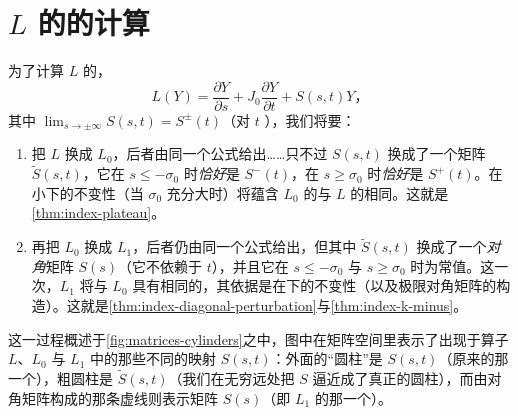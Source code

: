 
\section{\texorpdfstring{$L$}{L} 的\trIndex{}的计算}
\label{sec:index-computation}

为了计算 $L$ 的\trIndex，
\[
L(Y)=\frac{\partial Y}{\partial s}+J_0\frac{\partial Y}{\partial t}+S(s,t)Y\text{，}
\]
其中 $\lim_{s\to\pm\infty}S(s,t)=S^{\pm}(t)$（对 $t$ \trUniform），我们将要：
\begin{enumerate}[label=(\arabic*)]
\item 把 $L$ 换成 $L_0$，后者由同一个公式给出……只不过 $S(s,t)$ 换成了一个矩阵 $\widetilde{S}(s,t)$，它在 $s\le-\sigma_0$ 时\emph{恰好}是 $S^{-}(t)$，在 $s\ge\sigma_0$ 时\emph{恰好}是 $S^{+}(t)$。\trIndex{}在小\trPerturbation{}下的不变性（当 $\sigma_0$ 充分大时）将蕴含 $L_0$ 的\trIndex{}与 $L$ 的相同。这就是\cref{thm:index-plateau}。
\item 再把 $L_0$ 换成 $L_1$，后者仍由同一个公式给出，但其中 $\widetilde{S}(s,t)$ 换成了一个\emph{对角}矩阵 $S(s)$（它不依赖于 $t$），并且它在 $s\le-\sigma_0$ 与 $s\ge\sigma_0$ 时为常值。这一次，$L_1$ 将与 $L_0$ 具有相同的\trIndex，其依据是\trIndex{}在\trHomotopy{}下的不变性（以及极限对角矩阵的构造）。这就是\cref{thm:index-diagonal-perturbation}与\cref{thm:index-k-minus}。
\end{enumerate}

这一过程概述于\cref{fig:matrices-cylinders}之中，图中在矩阵空间里表示了出现于算子 $L$、$L_0$ 与 $L_1$ 中的那些不同的映射 $S(s,t)$：外面的“圆柱”是 $S(s,t)$（原来的那一个），粗圆柱是 $\widetilde{S}(s,t)$（我们在无穷远处把 $S$ 逼近成了真正的圆柱），而由对角矩阵构成的那条虚线则表示矩阵 $S(s)$（即 $L_1$ 的那一个）。

